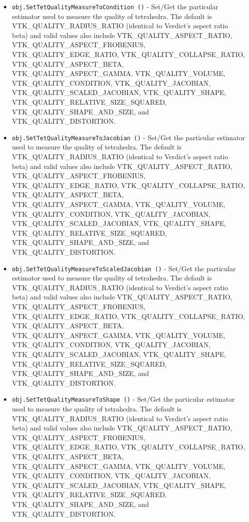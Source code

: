 \begin{itemize}
\item  \verb|obj.SetTetQualityMeasureToCondition ()| -  Set/Get the particular estimator used to measure the quality of tetrahedra.
 The default is VTK\_QUALITY\_RADIUS\_RATIO (identical to Verdict's aspect
 ratio beta) and valid values also include
 VTK\_QUALITY\_ASPECT\_RATIO, VTK\_QUALITY\_ASPECT\_FROBENIUS, VTK\_QUALITY\_EDGE\_RATIO,
 VTK\_QUALITY\_COLLAPSE\_RATIO, VTK\_QUALITY\_ASPECT\_BETA, VTK\_QUALITY\_ASPECT\_GAMMA, 
 VTK\_QUALITY\_VOLUME, VTK\_QUALITY\_CONDITION, VTK\_QUALITY\_JACOBIAN, 
 VTK\_QUALITY\_SCALED\_JACOBIAN, VTK\_QUALITY\_SHAPE, VTK\_QUALITY\_RELATIVE\_SIZE\_SQUARED,
 VTK\_QUALITY\_SHAPE\_AND\_SIZE, and VTK\_QUALITY\_DISTORTION.

\item  \verb|obj.SetTetQualityMeasureToJacobian ()| -  Set/Get the particular estimator used to measure the quality of tetrahedra.
 The default is VTK\_QUALITY\_RADIUS\_RATIO (identical to Verdict's aspect
 ratio beta) and valid values also include
 VTK\_QUALITY\_ASPECT\_RATIO, VTK\_QUALITY\_ASPECT\_FROBENIUS, VTK\_QUALITY\_EDGE\_RATIO,
 VTK\_QUALITY\_COLLAPSE\_RATIO, VTK\_QUALITY\_ASPECT\_BETA, VTK\_QUALITY\_ASPECT\_GAMMA, 
 VTK\_QUALITY\_VOLUME, VTK\_QUALITY\_CONDITION, VTK\_QUALITY\_JACOBIAN, 
 VTK\_QUALITY\_SCALED\_JACOBIAN, VTK\_QUALITY\_SHAPE, VTK\_QUALITY\_RELATIVE\_SIZE\_SQUARED,
 VTK\_QUALITY\_SHAPE\_AND\_SIZE, and VTK\_QUALITY\_DISTORTION.

\item  \verb|obj.SetTetQualityMeasureToScaledJacobian ()| -  Set/Get the particular estimator used to measure the quality of tetrahedra.
 The default is VTK\_QUALITY\_RADIUS\_RATIO (identical to Verdict's aspect
 ratio beta) and valid values also include
 VTK\_QUALITY\_ASPECT\_RATIO, VTK\_QUALITY\_ASPECT\_FROBENIUS, VTK\_QUALITY\_EDGE\_RATIO,
 VTK\_QUALITY\_COLLAPSE\_RATIO, VTK\_QUALITY\_ASPECT\_BETA, VTK\_QUALITY\_ASPECT\_GAMMA, 
 VTK\_QUALITY\_VOLUME, VTK\_QUALITY\_CONDITION, VTK\_QUALITY\_JACOBIAN, 
 VTK\_QUALITY\_SCALED\_JACOBIAN, VTK\_QUALITY\_SHAPE, VTK\_QUALITY\_RELATIVE\_SIZE\_SQUARED,
 VTK\_QUALITY\_SHAPE\_AND\_SIZE, and VTK\_QUALITY\_DISTORTION.

\item  \verb|obj.SetTetQualityMeasureToShape ()| -  Set/Get the particular estimator used to measure the quality of tetrahedra.
 The default is VTK\_QUALITY\_RADIUS\_RATIO (identical to Verdict's aspect
 ratio beta) and valid values also include
 VTK\_QUALITY\_ASPECT\_RATIO, VTK\_QUALITY\_ASPECT\_FROBENIUS, VTK\_QUALITY\_EDGE\_RATIO,
 VTK\_QUALITY\_COLLAPSE\_RATIO, VTK\_QUALITY\_ASPECT\_BETA, VTK\_QUALITY\_ASPECT\_GAMMA, 
 VTK\_QUALITY\_VOLUME, VTK\_QUALITY\_CONDITION, VTK\_QUALITY\_JACOBIAN, 
 VTK\_QUALITY\_SCALED\_JACOBIAN, VTK\_QUALITY\_SHAPE, VTK\_QUALITY\_RELATIVE\_SIZE\_SQUARED,
 VTK\_QUALITY\_SHAPE\_AND\_SIZE, and VTK\_QUALITY\_DISTORTION.


\end{itemize}
